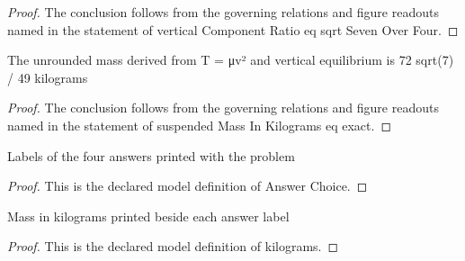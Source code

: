 \begin{proof}
  The conclusion follows from the governing relations and figure readouts named in the statement of vertical Component Ratio eq sqrt Seven Over Four.
\end{proof}
\begin{lemma}
  \label{lem:physics:phyx-mini-0242:phyxminiproblems-problemphyxmini0242-suspendedmassinkilograms-eq-exact}
  The unrounded mass derived from T = μv² and vertical equilibrium is 72 sqrt(7) / 49 kilograms
\end{lemma}
\begin{proof}
  The conclusion follows from the governing relations and figure readouts named in the statement of suspended Mass In Kilograms eq exact.
\end{proof}
\begin{definition}
  \label{def:physics:phyx-mini-0242:phyxminiproblems-problemphyxmini0242-answerchoice}
  Labels of the four answers printed with the problem
\end{definition}
\begin{proof}
  This is the declared model definition of Answer Choice.
\end{proof}
\begin{definition}[kilograms]
  \label{def:physics:phyx-mini-0242:phyxminiproblems-problemphyxmini0242-answerchoice-kilograms}
  Mass in kilograms printed beside each answer label
\end{definition}
\begin{proof}
  This is the declared model definition of kilograms.
\end{proof}
